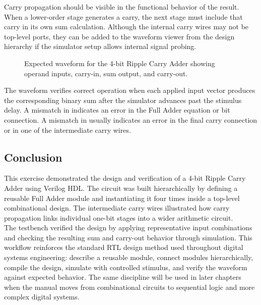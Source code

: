 \noindent Carry propagation should be visible in the functional behavior of the result. When a
lower-order stage generates a carry, the next stage must include that carry in its own sum
calculation. Although the internal carry wires may not be top-level ports, they can be added to the
waveform viewer from the design hierarchy if the simulator setup allows internal signal probing.

\begin{figure}[H]
    \centering
    \caption{Expected waveform for the 4-bit Ripple Carry Adder showing operand inputs, carry-in, sum output, and carry-out.}
    \label{fig:ripple_carry_adder_waveform}
\end{figure}

\noindent The waveform verifies correct operation when each applied input vector produces the
corresponding binary sum after the simulator advances past the stimulus delay. A mismatch in
 indicates an error in the Full Adder equation or bit connection. A mismatch in
 usually indicates an error in the final carry connection or in one of the
intermediate carry wires.

\subsection{Conclusion}
This exercise demonstrated the design and verification of a 4-bit Ripple Carry Adder using Verilog
HDL. The circuit was built hierarchically by defining a reusable Full Adder module and instantiating
it four times inside a top-level combinational design. The intermediate carry wires illustrated how
carry propagation links individual one-bit stages into a wider arithmetic circuit.\\

\noindent The testbench verified the design by applying representative input combinations and
checking the resulting sum and carry-out behavior through simulation. This workflow reinforces the
standard RTL design method used throughout digital systems engineering: describe a reusable module,
connect modules hierarchically, compile the design, simulate with controlled stimulus, and verify
the waveform against expected behavior. The same discipline will be used in later chapters when the
manual moves from combinational circuits to sequential logic and more complex digital systems.
